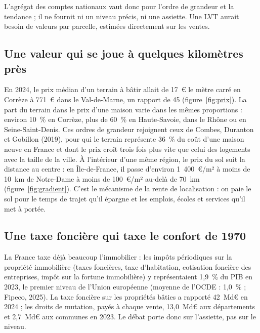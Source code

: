 \documentclass[11pt,a4paper]{article}
\begin{document}
L'agrégat des comptes nationaux vaut donc pour l'ordre de grandeur et la tendance ; il ne
fournit ni un niveau précis, ni une assiette. Une LVT aurait besoin de valeurs par parcelle,
estimées directement sur les ventes.



\subsection{Une valeur qui se joue à quelques kilomètres près}

En 2024, le prix médian d'un terrain à bâtir allait de 17~€ le mètre carré en Corrèze à 771~€ dans
le Val-de-Marne, un rapport de 45 (figure~\ref{fig:prix}). La part du terrain dans le prix d'une
maison varie dans les mêmes proportions : environ 10~\% en Corrèze, plus de 60~\% en Haute-Savoie,
dans le Rhône ou en Seine-Saint-Denis. Ces ordres de grandeur rejoignent ceux de Combes, Duranton
et Gobillon (2019), pour qui le terrain représente 36~\% du coût d'une maison neuve en France et
dont le prix croît trois fois plus vite que celui des logements avec la taille de la ville. À l'intérieur d'une même région, le prix du sol suit la
distance au centre : en Île-de-France, il passe d'environ 1~400~€/m² à moins de 10~km de
Notre-Dame à moins de 100~€/m² au-delà de 70~km (figure~\ref{fig:gradient}). C'est le mécanisme de
la rente de localisation : on paie le sol pour le temps de trajet qu'il épargne et les emplois,
écoles et services qu'il met à portée.



\subsection{Une taxe foncière qui taxe le confort de 1970}

La France taxe déjà beaucoup l'immobilier : les impôts périodiques sur la propriété immobilière
(taxes foncières, taxe d'habitation, cotisation foncière des entreprises, impôt sur la fortune
immobilière) y représentaient 1,9~\% du PIB en 2023, le premier niveau de l'Union européenne
(moyenne de l'OCDE : 1,0~\% ; Fipeco, 2025). La taxe foncière sur les propriétés bâties a rapporté 42~Md€ en 2024 ;
les droits de mutation, payés à chaque vente, 13,0~Md€ aux départements et 2,7~Md€ aux communes
en 2023. Le débat porte donc sur l'assiette, pas sur le niveau.
\end{document}
